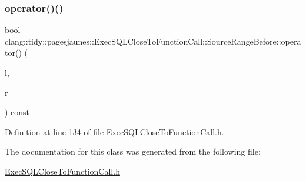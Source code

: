 \subsubsection{\texorpdfstring{operator()()}{operator()()}}
{\footnotesize\ttfamily bool clang\+::tidy\+::pagesjaunes\+::\+Exec\+S\+Q\+L\+Close\+To\+Function\+Call\+::\+Source\+Range\+Before\+::operator() (\begin{DoxyParamCaption}\item[{const \hyperlink{classclang_1_1tidy_1_1pagesjaunes_1_1_exec_s_q_l_close_to_function_call_1_1_source_range_for_string_literals}{Source\+Range\+For\+String\+Literals} \&}]{l,  }\item[{const \hyperlink{classclang_1_1tidy_1_1pagesjaunes_1_1_exec_s_q_l_close_to_function_call_1_1_source_range_for_string_literals}{Source\+Range\+For\+String\+Literals} \&}]{r }\end{DoxyParamCaption}) const\hspace{0.3cm}{\ttfamily [inline]}}



Definition at line 134 of file Exec\+S\+Q\+L\+Close\+To\+Function\+Call.\+h.



The documentation for this class was generated from the following file\+:\begin{DoxyCompactItemize}
\item 
\hyperlink{_exec_s_q_l_close_to_function_call_8h}{Exec\+S\+Q\+L\+Close\+To\+Function\+Call.\+h}\end{DoxyCompactItemize}
